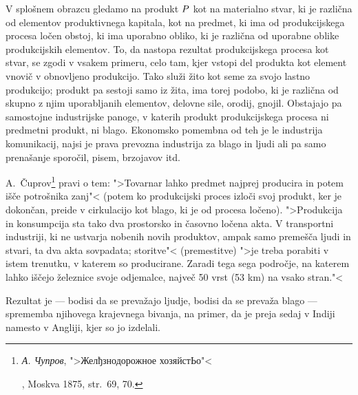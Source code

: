 \documentclass[kapital_02.tex]{subfiles}
\begin{document}
V splošnem obrazcu gledamo na produkt \(P\) kot na materialno stvar, ki je različna od elementov produktivnega kapitala, kot na predmet, ki ima od produkcijskega procesa ločen obstoj, ki ima uporabno obliko, ki je različna od uporabne oblike produkcijskih elementov. To, da nastopa rezultat produkcijskega procesa kot stvar, se zgodi v vsakem primeru, celo tam, kjer vstopi del produkta kot element vnovič v obnovljeno produkcijo. Tako služi žito kot seme za svojo lastno produkcijo; produkt pa sestoji samo iz žita, ima torej podobo, ki je različna od skupno z njim uporabljanih elementov, delovne sile, orodij, gnojil. Obstajajo pa samostojne industrijske panoge, v katerih produkt produkcijskega procesa ni predmetni produkt, ni blago. Ekonomsko pomembna od teh je le industrija komunikacij, najsi je prava prevozna industrija za blago in ljudi ali pa samo prenašanje sporočil, pisem, brzojavov itd.

A.~Čuprov\footnote{\begin{otherlanguage}{russian}\emph{А. Чупров}, ">Желђзнодорожное хозяйстЬо"<\end{otherlanguage}, Moskva 1875, str.\ 69, 70.} pravi o tem: ">Tovarnar lahko predmet najprej producira in potem išče potrošnika zanj"< (potem ko produkcijski proces izloči svoj produkt, ker je dokončan, preide v cirkulacijo kot blago, ki je od procesa ločeno). ">Produkcija in konsumpcija sta tako dva prostorsko in časovno ločena akta. V transportni industriji, ki ne ustvarja nobenih novih produktov, ampak samo premešča ljudi in stvari, ta dva akta sovpadata; storitve"< (premestitve) ">je treba porabiti v istem trenutku, v katerem so producirane. Zaradi tega sega področje, na katerem lahko iščejo železnice svoje odjemalce, največ 50 vrst (53 km) na vsako stran."<

Rezultat je --- bodisi da se prevažajo ljudje, bodisi da se prevaža blago --- sprememba njihovega krajevnega bivanja, na primer, da je preja sedaj v Indiji namesto v Angliji, kjer so jo izdelali.
\end{document}
